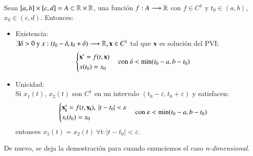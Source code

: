 \begin{thm}
    Sean $[a,b] \times [c,d] = A \subset \mathbb{R} \times \mathbb{R}$, una función $f: A \longrightarrow \mathbb{R}$ con $f \in C^1$ y $t_0\in(a,b)$, $x_0\in(c,d)$. Entonces:\\
    \begin{itemize}
        \item Existencia:\\
            $
                \exists \delta > 0 \text{ y } x:(t_0 - \delta, t_0 + \delta) \longrightarrow \mathbb{R}, \mathbf{x}\in C^1
            $ tal que $\mathbf{x}$ es solución del PVI:
            $$
                \begin{cases}
                    \mathbf{x'} = f(t, \mathbf{x})\\
                    x(t_0) = x_0
                \end{cases}
                \text{con } \delta < \min(t_0 - a, b - t_0)
            $$
        \item Unicidad:\\
        Si $x_1(t)$, $x_2(t)$ son $C^1$ en un intervalo $(t_0-\varepsilon, t_0+\varepsilon)$ y satisfacen:\\
        $$
            \begin{cases}
                \mathbf{x_i'} = f(t, \mathbf{x_i}),\ |t-t_0| < \varepsilon\\
                x_i(t_0) = x_0
            \end{cases}
            \text{con } \varepsilon < \min(t_0 - a, b - t_0)
        $$ entonces $x_1(t) = x_2(t)\ \forall t : |t-t_0| < \varepsilon$.
    \end{itemize}
\end{thm}
De nuevo, se deja la demostración para cuando enunciemos el caso \textit{n-dimensional}.
